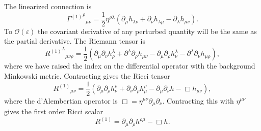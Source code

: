 \documentclass[aps,prd,amsfonts,amssymb,amsmath,nofootinbib,reprint,showpacs]{revtex4-1}
\newcommand{\order}[1]{\ensuremath{\mathcal{O}({#1})}}
\begin{document}
The linearized connection is
\begin{equation}
{{\Gamma^{(1)}}^\rho}_{\mu\nu} = \frac{1}{2}\eta^{\rho\lambda}(\partial_\mu h_{\lambda\nu} + \partial_\nu h_{\lambda\mu} - \partial_\lambda h_{\mu\nu}).
\label{eq:Lin_Gamma}
\end{equation}
To $\order{\varepsilon}$ the covariant derivative of any perturbed quantity will be the same as the partial derivative. The Riemann tensor is
\begin{equation}
{{R^{(1)}}^\lambda}_{\mu\nu\rho} = \frac{1}{2}(\partial_\mu\partial_\nu h^\lambda_\rho + \partial^\lambda\partial_\rho h_{\mu\nu} - \partial_\mu\partial_\rho h^\lambda_\nu - \partial^\lambda\partial_\nu h_{\mu\rho}),
\label{eq:Lin_Riemann}
\end{equation}
where we have raised the index on the differential operator with the background Minkowski metric. Contracting gives the Ricci tensor
\begin{equation}
{R^{(1)}}_{\mu\nu} = \frac{1}{2}(\partial_\mu\partial_\rho h^\rho_\nu + \partial_\nu\partial_\rho h^\rho_\mu - \partial_\mu\partial_\nu h - \Box h_{\mu\nu}),
\label{eq:Ricci}
\end{equation}
where the d'Alembertian operator is $\Box = \eta^{\mu\nu}\partial_\mu\partial_\nu$. Contracting this with $\eta^{\mu\nu}$ gives the first order Ricci scalar
\begin{equation}
R^{(1)} = \partial_\mu\partial_\rho h^{\rho\mu} - \Box h.
\label{eq:Scalar}
\end{equation}
\end{document}
